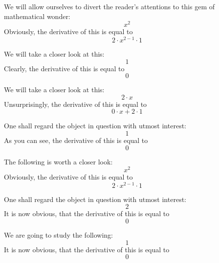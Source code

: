 \documentclass{article}
\begin{document}
We will allow ourselves to divert the reader's attentions to this gem of mathematical wonder:
\begin{equation}
x ^{2 } 
\end{equation}
Obviously, the derivative of this is equal to
\begin{equation}
2 \cdot x ^{2 - 1 } \cdot 1 
\end{equation}

We will take a closer look at this:
\begin{equation}
1 
\end{equation}
Clearly, the derivative of this is equal to
\begin{equation}
0 
\end{equation}

We will take a closer look at this:
\begin{equation}
2 \cdot x 
\end{equation}
Unsurprisingly, the derivative of this is equal to
\begin{equation}
0 \cdot x + 2 \cdot 1 
\end{equation}

One shall regard the object in question with utmost interest:
\begin{equation}
1 
\end{equation}
As you can see, the derivative of this is equal to
\begin{equation}
0 
\end{equation}

The following is worth a closer look:
\begin{equation}
x ^{2 } 
\end{equation}
Obviously, the derivative of this is equal to
\begin{equation}
2 \cdot x ^{2 - 1 } \cdot 1 
\end{equation}

One shall regard the object in question with utmost interest:
\begin{equation}
2 
\end{equation}
It is now obvious, that the derivative of this is equal to
\begin{equation}
0 
\end{equation}

We are going to study the following:
\begin{equation}
1 
\end{equation}
It is now obvious, that the derivative of this is equal to
\begin{equation}
0 
\end{equation}
\end{document}
